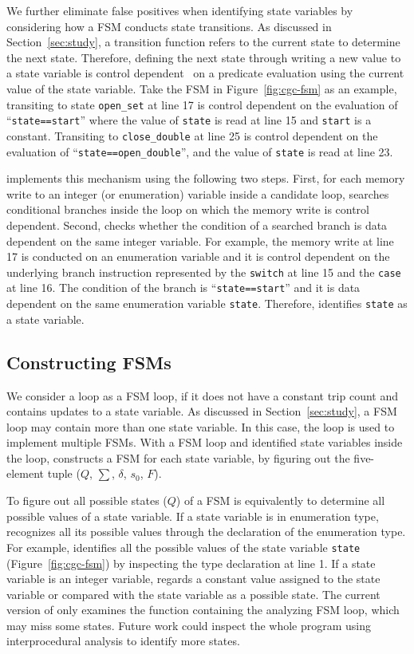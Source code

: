 We further eliminate false positives when identifying state variables 
by considering how a FSM conducts state transitions. 
As discussed in Section~\ref{sec:study}, 
a transition function refers to the current state to determine the next state. 
Therefore, defining the next state through writing a new value to a state variable 
is control dependent~\cite{cdg} on a predicate evaluation 
using the current value of the state variable.  
Take the FSM in Figure~\ref{fig:cgc-fsm} as an example, 
transiting to state \texttt{open\_set} at line 17
is control dependent on the evaluation of ``\texttt{state==start}''
where the value of \texttt{state} is read at line 15 and \texttt{start} is a constant. 
Transiting to \texttt{close\_double} at 
line 25 is control dependent on the 
evaluation of ``\texttt{state==open\_double}'', 
and the value of \texttt{state} is read at line 23.

\Tool{} implements this mechanism using the following two steps. 
First, for each memory write to an integer (or enumeration) 
variable inside a candidate loop, 
\Tool{} searches conditional branches inside the loop 
on which the memory write is control dependent. 
Second, \Tool{} checks whether the condition 
of a searched branch 
is data dependent on the same integer variable. 
For example, the memory write at line 17 is conducted on an enumeration variable
and it is control dependent on the underlying branch 
instruction represented by 
the \texttt{switch} at line 15 and the \texttt{case} at line 16.  
The condition of the branch is ``\texttt{state==start}'' and it is 
data dependent on the same enumeration variable \texttt{state}. 
Therefore, \Tool{} identifies \texttt{state} as a state variable. 


\subsection{Constructing FSMs}
\label{sec:tuple}
We consider a loop as a FSM loop, if it does not have a constant trip count 
and contains updates to a state variable.
As discussed in Section~\ref{sec:study}, 
a FSM loop may contain more than one state variable. 
In this case, the loop is used to implement multiple FSMs.
With a FSM loop and identified state variables inside the loop, 
\Tool{} constructs a FSM for each state variable, 
by figuring out the five-element 
tuple ($Q$, $\sum$, $\delta$, $s_0$, $F$). 

To figure out all possible states ($Q$) of a FSM 
is equivalently to determine all possible values of a state variable. 
If a state variable is in enumeration type, 
\Tool{} recognizes all its possible values 
through the declaration of the enumeration type. 
For example, \Tool{} identifies all the possible values of 
the state variable \texttt{state} (Figure~\ref{fig:cgc-fsm}) 
by inspecting the type declaration at line 1. 
If a state variable is an integer variable, \Tool{} regards 
a constant value assigned to the state variable or 
compared with the state variable as a possible state. 
The current version of \Tool{} only examines the function
containing the analyzing FSM loop, which may miss some states. 
Future work could inspect the whole program using interprocedural analysis 
to identify more states. 

